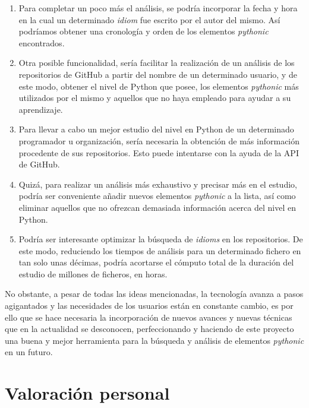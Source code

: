 \documentclass[a4paper, 12pt]{book}
\begin{document}
\begin{enumerate}
  
    \item Para completar un poco más el análisis, se podría incorporar la fecha y hora en la cual un determinado \textit{idiom} fue escrito por el autor del mismo. Así podríamos obtener una cronología y orden de los elementos \textit{pythonic} encontrados.
    
    
    \item Otra posible funcionalidad, sería facilitar la realización de un análisis de los repositorios de GitHub a partir del nombre de un determinado usuario, y de este modo, obtener el nivel de Python que posee, los elementos \textit{pythonic} más utilizados por el mismo y aquellos que no haya empleado para ayudar a su aprendizaje.
    
    
    \item Para llevar a cabo un mejor estudio del nivel en Python de un determinado programador u organización, sería necesaria la obtención de más información procedente de sus repositorios. Esto puede intentarse con la ayuda de la API de GitHub. 
    
    
    \item Quizá, para realizar un análisis más exhaustivo y precisar más en el estudio, podría ser conveniente añadir nuevos elementos \textit{pythonic} a la lista, así como eliminar aquellos que no ofrezcan demasiada información acerca del nivel en Python.
    
    
    \item Podría ser interesante optimizar la búsqueda de \textit{idioms} en los repositorios. De este modo, reduciendo los tiempos de análisis para un determinado fichero en tan solo unas décimas, podría acortarse el cómputo total de la duración del estudio de millones de ficheros, en horas.
    
\end{enumerate}


No obstante, a pesar de todas las ideas mencionadas, la tecnología avanza a pasos agigantados y las necesidades de los usuarios están en constante cambio, es por ello que se hace necesaria la incorporación de nuevos avances y nuevas técnicas que en la actualidad se desconocen, perfeccionando y haciendo de este proyecto una buena y mejor herramienta para la búsqueda y análisis de elementos \textit{pythonic} en un futuro.

\section{Valoración personal}
\label{sec:valoracion}
\end{document}
